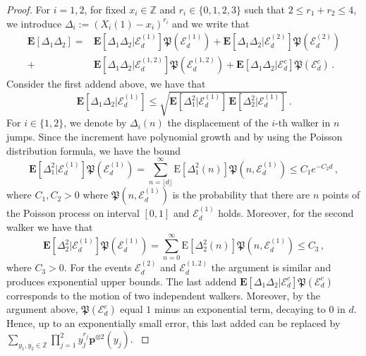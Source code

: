 \documentclass[a4paper,11pt,oneside,reqno]{amsart}
\theoremstyle{definition}
\renewcommand{\leq}{\leqslant}
\numberwithin{equation}{section}
\begin{document}
\begin{proof}
For $i=1,2$, for fixed $x_{i}\in \mathbb{Z}$ and $ r_{i} \in\{0,1,2,3\}$ such that $2\leq r_{1}+r_{2}\leq 4$, we introduce $\Delta_{i}:=(X_{i}(1)-x_{i})^{r_{i}}$ and we write that 
{\color{black}
\begin{equation*}
	\begin{split}	\mathbf{E}\left[\Delta_{1}\Delta_{2}\right]=&\mathbf{E}\left[\Delta_{1}\Delta_{2}|\mathcal{E}_{d}^{(1)}\right]\mathfrak{P}(\mathcal{E}_{d}^{(1)})+\mathbf{E}\left[\Delta_{1}\Delta_{2}|\mathcal{E}_{d}^{(2)}\right]\mathfrak{P}(\mathcal{E}_{d}^{(2)})
		\\+&
		\mathbf{E}\left[\Delta_{1}\Delta_{2}|\mathcal{E}_{d}^{(1,2)}\right]\mathfrak{P}(\mathcal{E}_{d}^{(1,2)})+\mathbf{E}\left[\Delta_{1}\Delta_{2}|\mathcal{E}_{d}^{c}\right]\mathfrak{P}(\mathcal{E}_{d}^{c})\,.
	\end{split}
\end{equation*}
Consider the first addend above, we have that 
\begin{equation*}
	\mathbf{E}[\Delta_{1}\Delta_{2}|\mathcal{E}_{d}^{(1)}]\leq \sqrt{\mathbf{E}[\Delta_{1}^{2}|\mathcal{E}_{d}^{(1)}]\,\mathbf{E}[\Delta_{2}^{2}|\mathcal{E}_{d}^{(1)}]}\,.
\end{equation*}
For $i\in\{1,2\}$, we denote by $\Delta_{i}(n)$ the displacement of the $i$-th walker in $n$ jumps. Since the increment have polynomial growth and by using the Poisson distribution formula,  we have the bound 
\begin{equation*}
	\mathbf{E}\left[\Delta_{1}^{2}|\mathcal{E}_{d}^{(1)}\right]\mathfrak{P}(\mathcal{E}_{d}^{(1)})
	=\sum_{n=\lfloor d\rfloor }^{\infty} \mathrm{E}[\Delta_{1}^{2}(n)]\mathfrak{P}(n,\mathcal{E}_{d}^{(1)})\leq C_{1} e^{-C_{2} d }\,,
\end{equation*}
where $C_{1},C_{2}>0$ where $\mathfrak{P}(n,\mathcal{E}_{d}^{(1)})$ is the probability that there are $n$ points of the Poisson process on interval $[0,1]$ and $\mathcal{E}_{d}^{(1)}$ holds.
Moreover, for the second walker we have that 
\begin{equation*}
	\mathbf{E}\left[\Delta_{2}^{2}|\mathcal{E}_{d}^{(1)}\right]\mathfrak{P}(\mathcal{E}_{d}^{(1)})= \sum_{n=0 }^{\infty} \mathrm{E}[\Delta_{2}^{2}(n)]\mathfrak{P}(n,\mathcal{E}_{d}^{(1)})\leq C_{3}\,,
\end{equation*}
where $C_{3}>0$.
For the events $\mathcal{E}_{d}^{(2)}$ and $\mathcal{E}_{d}^{(1,2)}$ the argument is similar and produces exponential upper bounds. The last addend $\mathbf{E}\left[\Delta_{1}\Delta_{2}|\mathcal{E}_{d}^{c}\right]\mathfrak{P}(\mathcal{E}_{d}^{c})$ corresponds to the motion of two independent walkers. Moreover, by the argument above,  $\mathfrak{P}(\mathcal{E}_{d}^{c})$ equal $1$ minus an exponential term, decaying to $0$ in $d$. Hence, up to an exponentially small error, this last added can be replaced by  $\sum_{y_{1},y_{2}\in \mathbb{Z}}\prod_{j=1}^{2}y_{j}^{r_{j}}\mathbf{p}^{\otimes 2}(y_{j})$. 
}


\end{proof}
\end{document}
